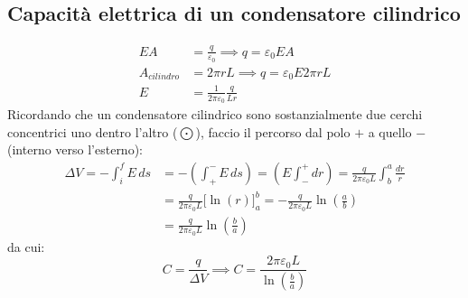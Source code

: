         \subsection{Capacità elettrica di un condensatore cilindrico}
            \begin{align*}
                EA &= \frac{q}{\varepsilon_0} \implies q = \varepsilon_0 E A \\
                A_{cilindro} &= 2\pi rL \implies q = \varepsilon_0E2\pi rL \\
                E &= \frac{1}{2\pi\varepsilon_0}\frac{q}{Lr}
            \end{align*}
        Ricordando che un condensatore cilindrico sono sostanzialmente due 
        cerchi concentrici uno dentro l'altro ($\bigodot$), faccio il percorso
        dal polo $+$ a quello $-$ (interno verso l'esterno):
            \begin{align*}
                \Delta V = -\int_{i}^{f} E \,ds &= -(\int_{+}^{-} E\,ds)
                    = (E\int_{-}^{+}dr) = \frac{q}{2\pi\varepsilon_0L}
                    \int_{b}^{a} \frac{dr}{r} \\
                &= \frac{q}{2\pi\varepsilon_0L}\Bigg[\ln(r)\Bigg]_{a}^{b}
                    = - \frac{q}{2\pi\varepsilon_0L}\ln(\frac{a}{b}) \\
                &= \frac{q}{2\pi\varepsilon_0L}\ln(\frac{b}{a})
            \end{align*}
        da cui:
            \begin{equation}
                C = \frac{q}{\Delta V} \implies C = \frac{2\pi\varepsilon_0L}
                {\ln(\frac{b}{a})}
            \end{equation}

